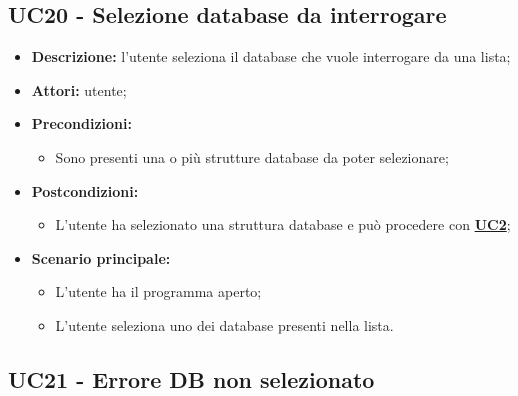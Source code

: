 \documentclass[5pt]{article}
\begin{document}
\subsection{UC20 - Selezione database da interrogare}
\label{sec:UC20}
\begin{itemize}
	\item \textbf{Descrizione:} l’utente seleziona il database che vuole interrogare da una lista;
	\item \textbf{Attori:} utente;
	\item \textbf{Precondizioni:}
	\begin{itemize}
		\item Sono presenti una o più strutture database da poter selezionare;
	\end{itemize}
	\item \textbf{Postcondizioni:}
	\begin{itemize}
		\item L’utente ha selezionato una struttura database e può procedere con \hyperref[sec:UC2]{\textbf{UC2}};
	\end{itemize}
	\item \textbf{Scenario principale:}
	\begin{itemize}
		\item L’utente ha il programma aperto;
		\item L’utente seleziona uno dei database presenti nella lista.
	\end{itemize}
\end{itemize}

\subsection{UC21 - Errore DB non selezionato}
\label{sec:UC21}
\end{document}
